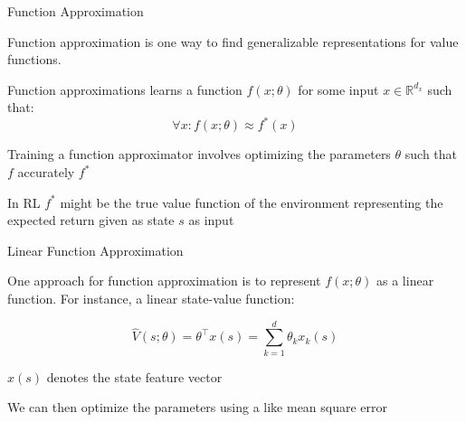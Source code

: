 \begin{frame}{Function Approximation}

Function approximation is one way to find generalizable representations for value functions. 

\blist
\item Function approximations learns a  function $f(x; \theta)$ for some input $x \in \mathbb{R}^{d_x}$ such that: 
\elist
\vspace{-2pt}
\[
\forall x: f(x; \theta) \approx f^*(x)
\]

\blist
    \item Training a function approximator involves optimizing the parameters $\theta$ such that $f$ accurately  $f^*$
    \item In RL $f^*$ might be the true value function of the environment representing the expected return given as state $s$ as input
\elist

    
\end{frame}

\begin{frame}[t]{Linear Function Approximation}

One approach for function approximation is to represent $f(x; \theta)$ as a linear function. For instance, a linear state-value function:

\[
\hat{V}(s; \theta) = \theta^\top x(s) = \sum^d_{k=1}\theta_k x_k (s)
\]

\blist
    \item $x(s)$ denotes the state feature vector
    \item We can then optimize the parameters using a  like mean square error
\elist




\end{frame}

